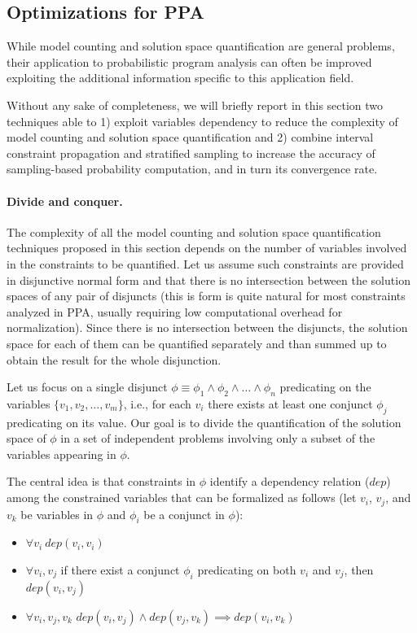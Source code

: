 \subsection{Optimizations for PPA}\label{sec:computingprobabilitiesOptimizations}


While model counting and solution space quantification are general problems, their application to probabilistic program analysis can often be improved exploiting the additional information specific to this application field.

Without any sake of completeness, we will briefly report in this section two techniques able to 1) exploit variables dependency to reduce the complexity of model counting and solution space quantification and 2) combine interval constraint propagation and stratified sampling to increase the accuracy of sampling-based probability computation, and in turn its convergence rate.

\paragraph{Divide and conquer.}
The complexity of all the model counting and solution space quantification techniques proposed in this section depends on the number of variables involved in the constraints to be quantified. Let us assume such constraints are provided in disjunctive normal form and that there is no intersection between the solution spaces of any pair of disjuncts (this is form is quite natural for most constraints analyzed in PPA, usually requiring low computational overhead for normalization). Since there is no intersection between the disjuncts, the solution space for each of them can be quantified separately and than summed up to obtain the result for the whole disjunction.

Let us focus on a single disjunct $\phi \equiv \phi_1 \land \phi_2 \land \dots \land \phi_n$ predicating on the variables $\{v_1, v_2, \dots, v_m\}$, i.e., for each $v_i$ there exists at least one conjunct $\phi_j$ predicating on its value. Our goal is to divide the quantification of the solution space of $\phi$ in a set of independent problems involving only a subset of the variables appearing in $\phi$. 

The central idea is that constraints in $\phi$ identify a dependency relation ($\textit{dep}$) among the constrained variables that can be formalized as follows (let $v_i$, $v_j$, and $v_k$ be variables in $\phi$ and $\phi_i$ be a conjunct in $\phi$):
\begin{itemize}
	\item $\forall v_i \ \textit{dep}(v_i,v_i)$
	\item $\forall v_i,v_j$ if there exist a conjunct $\phi_i$ predicating on both $v_i$ and $v_j$, then $\textit{dep}(v_i,v_j)$
	\item $\forall v_i,v_j,v_k$ $\textit{dep}(v_i,v_j) \land \textit{dep}(v_j,v_k) \implies \textit{dep}(v_i,v_k)$
\end{itemize}

